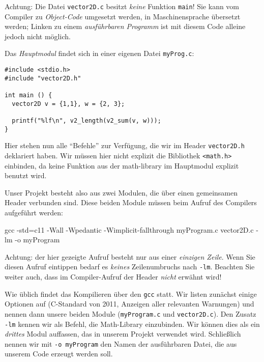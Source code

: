 Achtung: Die Datei \texttt{vector2D.c} besitzt \emph{keine} Funktion \texttt{main}! Sie kann vom Compiler zu \emph{Object-Code} umgesetzt werden, \ie in Maschinensprache übersetzt werden; Linken zu einem \emph{ausführbaren Programm} ist mit diesem Code alleine jedoch nicht möglich.

Das \emph{Hauptmodul} findet sich in einer eigenen Datei \texttt{myProg.c}:

\begin{codebox}
\begin{verbatim}
#include <stdio.h>
#include "vector2D.h"

int main () {
  vector2D v = {1,1}, w = {2, 3};
  
  printf("%lf\n", v2_length(v2_sum(v, w)));
}
\end{verbatim}
\end{codebox}

Hier stehen nun alle \enquote{Befehle} zur Verfügung, die wir im Header \texttt{vector2D.h} deklariert haben. Wir müssen hier nicht explizit die Bibliothek \texttt{<math.h>} einbinden, da keine Funktion aus der math-library im Hauptmodul explizit benutzt wird.

Unser Projekt besteht also aus zwei Modulen, die über einen gemeinsamen Header verbunden sind. Diese beiden Module müssen beim Aufruf des Compilers aufgeführt werden:

\begin{cmdbox}
gcc -std=c11 -Wall -Wpedantic -Wimplicit-fallthrough myProgram.c vector2D.c -lm -o myProgram
\end{cmdbox}

Achtung: der hier gezeigte Aufruf besteht nur aus einer \emph{einzigen Zeile}. Wenn Sie diesen Aufruf eintippen bedarf es \emph{keines} Zeilenumbruchs nach \texttt{-lm}. Beachten Sie weiter auch, dass im Compiler-Aufruf der Header \emph{nicht} erwähnt wird!

Wie üblich findet das Kompilieren über den \texttt{gcc} statt. Wir listen zunächst einige Optionen auf (C-Standard von 2011, Anzeigen aller relevanten Warnungen) und nennen dann unsere beiden Module (\texttt{myProgram.c} und \texttt{vector2D.c}). Den Zusatz \texttt{-lm} kennen wir als Befehl, die Math-Library einzubinden. Wir können dies als ein \emph{drittes} Modul auffassen, das in unserem Projekt verwendet wird. Schließlich nennen wir mit \texttt{-o myProgram} den Namen der ausführbaren Datei, die aus unserem Code erzeugt werden soll.


